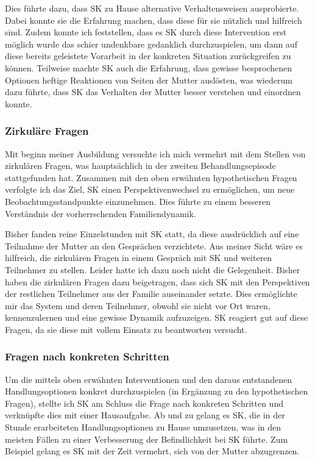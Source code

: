 Dies führte dazu, dass SK zu Hause alternative Verhaltensweisen ausprobierte. Dabei konnte sie die Erfahrung machen, dass diese für sie nützlich und hilfreich sind. Zudem konnte ich feststellen, dass es SK durch diese Intervention erst möglich wurde das schier undenkbare gedanklich durchzuspielen, um dann auf diese bereits geleistete Vorarbeit in der konkreten Situation zurückgreifen zu können. Teilweise machte SK auch die Erfahrung, dass gewisse besprochenen Optionen heftige Reaktionen von Seiten der Mutter auslösten, was wiederum dazu führte, dass SK das Verhalten der Mutter besser verstehen und einordnen konnte. 

\subsubsection{Zirkuläre Fragen}
Mit beginn meiner Ausbildung versuchte ich mich vermehrt mit dem Stellen von zirkulären Fragen, was hauptsächlich in der zweiten Behandlungsepisode stattgefunden hat. Zusammen mit den oben erwähnten hypothetischen Fragen verfolgte ich das Ziel, SK einen Perspektivenwechsel zu ermöglichen, um neue Beobachtungsstandpunkte einzunehmen. Dies führte zu einem besseren Verständnis der vorherrschenden Familiendynamik. 

Bisher fanden reine Einzelstunden mit SK statt, da diese ausdrücklich auf eine Teilnahme der Mutter an den Gesprächen verzichtete. Aus meiner Sicht wäre es hilfreich, die zirkulären Fragen in einem Gespräch mit SK und weiteren Teilnehmer zu stellen. Leider hatte ich dazu noch nicht die Gelegenheit. Bisher haben die zirkulären Fragen dazu beigetragen, dass sich SK mit den Perspektiven der restlichen Teilnehmer aus der Familie auseinander setzte. Dies ermöglichte mir das System und deren Teilnehmer, obwohl sie nicht vor Ort waren, kennenzulernen und eine gewisse Dynamik aufzuzeigen. SK reagiert gut auf diese Fragen, da sie diese mit vollem Einsatz zu beantworten versucht. 

\subsubsection{Fragen nach konkreten Schritten}
Um die mittels oben erwähnten Interventionen und den daraus entstandenen Handlungsoptionen konkret durchzuspielen (in Ergänzung zu den hypothetischen Fragen), stellte ich SK am Schluss die Frage nach konkreten Schritten und verknüpfte dies mit einer Hausaufgabe. Ab und zu gelang es SK, die in der Stunde erarbeiteten Handlungsoptionen zu Hause umzusetzen, was in den meisten Fällen zu einer Verbesserung der Befindlichkeit bei SK führte. Zum Beispiel gelang es SK mit der Zeit vermehrt, sich von der Mutter abzugrenzen.

